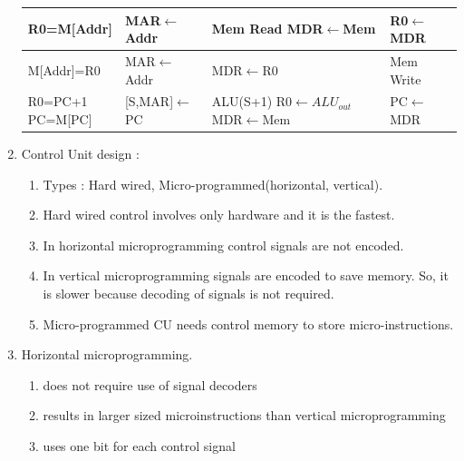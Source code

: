 \begin{enumerate}
\begin{minipage}{\linewidth}
\begin{myTableStyle}
\begin{tabular}{ |m{2.5cm}|m{2.5cm}|m{2.1cm}|m{2cm}| }
         R0=M[Addr] & MAR\(\leftarrow\)Addr & \makecell[l]{ Mem Read \\ MDR\(\leftarrow\)Mem }
                                             & R0\(\leftarrow\)MDR \\ \hline


         M[Addr]=R0 & MAR\(\leftarrow\)Addr & MDR\(\leftarrow\)R0
                                                & Mem Write \\ \hline

         \makecell[l]{R0=PC+1 \\ PC=M[PC]} & [S,MAR]\(\leftarrow\)PC
                                           & \makecell[l]{ALU(S+1)\\ R0\(\leftarrow ALU_{out}\)\\ MDR\(\leftarrow\)Mem }
                                           & PC\(\leftarrow\)MDR \\ \hline
      \end{tabular} \end{myTableStyle} \vspace{0.08in}
    \end{minipage}

    \item Control Unit design :
    \begin{enumerate}
      \item Types : Hard wired, Micro-programmed(horizontal, vertical).
      \item Hard wired control involves only hardware and it is the fastest.
      \item In horizontal microprogramming control signals are not encoded.
      \item In vertical microprogramming signals are encoded to save memory. So, it is slower because
            decoding of signals is not required.
      \item Micro-programmed CU needs control memory to store micro-instructions.
    \end{enumerate}

    \item Horizontal microprogramming.
      \begin{enumerate}
      \item does not require use of signal decoders
      \item results in larger sized microinstructions than vertical microprogramming
      \item uses one bit for each control signal
      \end{enumerate}


\end{enumerate}
